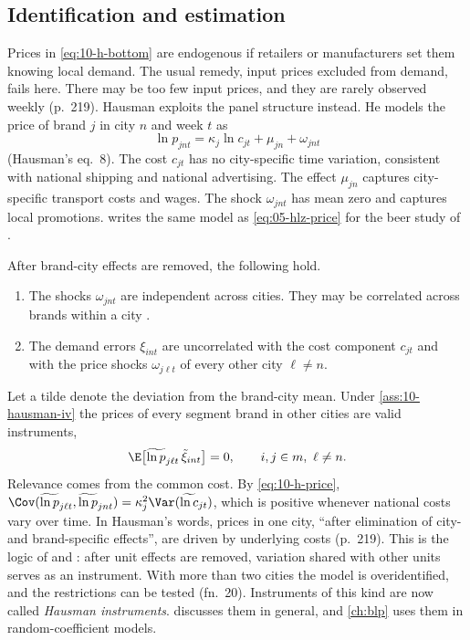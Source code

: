 \subsection{Identification and estimation}\label{sec:10-hausman-identification}

Prices in \eqref{eq:10-h-bottom} are endogenous if retailers or manufacturers set them knowing local demand.
The usual remedy, input prices excluded from demand, fails here. There may be too few input prices, and they
are rarely observed weekly (p.~219). Hausman exploits the panel structure instead. He models the price of
brand $j$ in city $n$ and week $t$ as
\begin{equation}\label{eq:10-h-price}
  \ln p_{jnt} = \kappa_j\ln c_{jt} + \mu_{jn} + \omega_{jnt}
\end{equation}
(Hausman's eq.~8). The cost $c_{jt}$ has no city-specific time variation, consistent with national shipping
and national advertising. The effect $\mu_{jn}$ captures city-specific transport costs and wages. The shock
$\omega_{jnt}$ has mean zero and captures local promotions.  writes the same
model as \eqref{eq:05-hlz-price} for the beer study of \citet{HausmanLeonardZona1994}.

\begin{assumption}\label{ass:10-hausman-iv}
After brand-city effects are removed, the following hold.
\begin{enumerate}[label=(\roman*)]
\item The shocks $\omega_{jnt}$ are independent across cities. They may be correlated across brands within a
city \citep[fn.~19]{Hausman1997}.
\item The demand errors $\xi_{int}$ are uncorrelated with the cost component $c_{jt}$ and with the price
shocks $\omega_{j\ell t}$ of every other city $\ell\neq n$.
\end{enumerate}
\end{assumption}

Let a tilde denote the deviation from the brand-city mean. Under \cref{ass:10-hausman-iv} the prices of every
segment brand in other cities are valid instruments,
\begin{equation}\label{eq:10-h-moment}
  \E\bigl[\widetilde{\ln p}_{j\ell t}\,\tilde\xi_{int}\bigr] = 0, \qquad i, j\in m,\ \ell\neq n.
\end{equation}
Relevance comes from the common cost. By \eqref{eq:10-h-price},
$\Cov(\widetilde{\ln p}_{j\ell t},\widetilde{\ln p}_{jnt}) = \kappa_j^2\Var(\widetilde{\ln c}_{jt})$, which is
positive whenever national costs vary over time. In Hausman's words, prices in one city, ``after elimination
of city- and brand-specific effects'', are driven by underlying costs (p.~219). This is the logic of
\citet{HausmanTaylor1981} and \citet{BreuschMizonSchmidt1989}: after unit effects are removed, variation
shared with other units serves as an instrument. With more than two cities the model is overidentified, and
the restrictions can be tested (fn.~20). Instruments of this kind are now called \emph{Hausman instruments}.
 discusses them in general, and \cref{ch:blp} uses them in random-coefficient
models.

